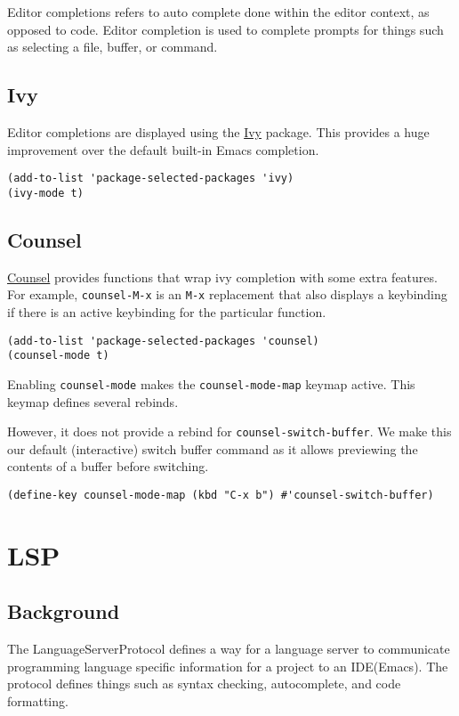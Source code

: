 \documentclass[11pt]{article}
\begin{document}
Editor completions refers to auto complete done within the editor context, as
opposed to code. Editor completion is used to complete prompts for things such
as selecting a file, buffer, or command.
\subsection{Ivy}
\label{sec:orgfe22080}

Editor completions are displayed using the \href{https://github.com/abo-abo/swiper?tab=readme-ov-file\#ivy}{Ivy} package. This provides a huge
improvement over the default built-in Emacs completion.

\begin{verbatim}
(add-to-list 'package-selected-packages 'ivy)
(ivy-mode t)
\end{verbatim}
\subsection{Counsel}
\label{sec:org0abfa22}

\href{https://github.com/abo-abo/swiper?tab=readme-ov-file\#counsel}{Counsel} provides functions that wrap ivy completion with some extra
features. For example, \texttt{counsel-M-x} is an \texttt{M-x} replacement that also displays
a keybinding if there is an active keybinding for the particular function.

\begin{verbatim}
(add-to-list 'package-selected-packages 'counsel)
(counsel-mode t)
\end{verbatim}

Enabling \texttt{counsel-mode} makes the \texttt{counsel-mode-map} keymap active. This keymap
defines several rebinds.


However, it does not provide a rebind for \texttt{counsel-switch-buffer}. We make this
our default (interactive) switch buffer command as it allows previewing the
contents of a buffer before switching.

\begin{verbatim}
(define-key counsel-mode-map (kbd "C-x b") #'counsel-switch-buffer)
\end{verbatim}
\section{LSP}
\label{sec:org7cb2ea7}

\subsection{Background}
\label{sec:org25c8f7d}
The LanguageServerProtocol defines a way for a language server to communicate
programming language specific information for a project to an IDE(Emacs). The
protocol defines things such as syntax checking, autocomplete, and code
formatting.
\end{document}
